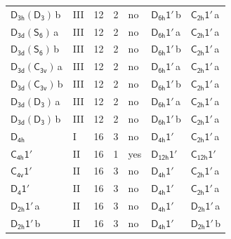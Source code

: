 \documentclass[10pt,a4paper]{article}
\numberwithin{equation}{section}
\newcommand{\grp}[1]{\mathsf{#1}}
\newcommand{\clsletter}[1]{\,{\scriptsize\color{black!55}#1}}
\begin{document}
{\begin{longtable}{@{}llrrlll@{}}
\href{D3h-D3.pdf}{$\grp{D_{3h}}(\grp{D_{3}})$}\clsletter{b} & III & 12 & 2 & no & \href{D6h-1p.pdf}{$\grp{D_{6h}1'}$}\clsletter{b} & \href{C2h-1p.pdf}{$\grp{C_{2h}1'}$}\clsletter{a}\\
\href{D3d-S6.pdf}{$\grp{D_{3d}}(\grp{S_{6}})$}\clsletter{a} & III & 12 & 2 & no & \href{D6h-1p.pdf}{$\grp{D_{6h}1'}$}\clsletter{a} & \href{C2h-1p.pdf}{$\grp{C_{2h}1'}$}\clsletter{a}\\
\href{D3d-S6.pdf}{$\grp{D_{3d}}(\grp{S_{6}})$}\clsletter{b} & III & 12 & 2 & no & \href{D6h-1p.pdf}{$\grp{D_{6h}1'}$}\clsletter{b} & \href{C2h-1p.pdf}{$\grp{C_{2h}1'}$}\clsletter{a}\\
\href{D3d-C3v.pdf}{$\grp{D_{3d}}(\grp{C_{3v}})$}\clsletter{a} & III & 12 & 2 & no & \href{D6h-1p.pdf}{$\grp{D_{6h}1'}$}\clsletter{a} & \href{C2h-1p.pdf}{$\grp{C_{2h}1'}$}\clsletter{a}\\
\href{D3d-C3v.pdf}{$\grp{D_{3d}}(\grp{C_{3v}})$}\clsletter{b} & III & 12 & 2 & no & \href{D6h-1p.pdf}{$\grp{D_{6h}1'}$}\clsletter{b} & \href{C2h-1p.pdf}{$\grp{C_{2h}1'}$}\clsletter{a}\\
\href{D3d-D3.pdf}{$\grp{D_{3d}}(\grp{D_{3}})$}\clsletter{a} & III & 12 & 2 & no & \href{D6h-1p.pdf}{$\grp{D_{6h}1'}$}\clsletter{a} & \href{C2h-1p.pdf}{$\grp{C_{2h}1'}$}\clsletter{a}\\
\href{D3d-D3.pdf}{$\grp{D_{3d}}(\grp{D_{3}})$}\clsletter{b} & III & 12 & 2 & no & \href{D6h-1p.pdf}{$\grp{D_{6h}1'}$}\clsletter{b} & \href{C2h-1p.pdf}{$\grp{C_{2h}1'}$}\clsletter{a}\\
\href{../../../rotation/data/pdf/D4h.pdf}{$\grp{D_{4h}}$} & I & 16 & 3 & no & \href{D4h-1p.pdf}{$\grp{D_{4h}1'}$} & \href{C2h-1p.pdf}{$\grp{C_{2h}1'}$}\clsletter{a}\\
\href{C4h-1p.pdf}{$\grp{C_{4h}1'}$} & II & 16 & 1 & yes & \href{D12h-1p.pdf}{$\grp{D_{12h}1'}$} & \href{C12h-1p.pdf}{$\grp{C_{12h}1'}$}\\
\href{C4v-1p.pdf}{$\grp{C_{4v}1'}$} & II & 16 & 3 & no & \href{D4h-1p.pdf}{$\grp{D_{4h}1'}$} & \href{C2h-1p.pdf}{$\grp{C_{2h}1'}$}\clsletter{a}\\
\href{D4-1p.pdf}{$\grp{D_{4}1'}$} & II & 16 & 3 & no & \href{D4h-1p.pdf}{$\grp{D_{4h}1'}$} & \href{C2h-1p.pdf}{$\grp{C_{2h}1'}$}\clsletter{a}\\
\href{D2h-1p.pdf}{$\grp{D_{2h}1'}$}\clsletter{a} & II & 16 & 3 & no & \href{D4h-1p.pdf}{$\grp{D_{4h}1'}$} & \href{D2h-1p.pdf}{$\grp{D_{2h}1'}$}\clsletter{a}\\
\href{D2h-1p.pdf}{$\grp{D_{2h}1'}$}\clsletter{b} & II & 16 & 3 & no & \href{D4h-1p.pdf}{$\grp{D_{4h}1'}$} & \href{D2h-1p.pdf}{$\grp{D_{2h}1'}$}\clsletter{b}\\

\end{longtable}}
\end{document}
